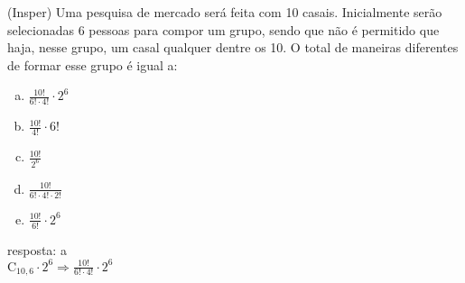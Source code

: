 \begin{ex}
   (Insper) Uma pesquisa de mercado será feita com 10 casais. Inicialmente serão selecionadas 6 pessoas para compor um grupo, sendo que não é permitido que haja, nesse grupo, um casal qualquer dentre os 10. O total de maneiras diferentes de formar esse grupo é igual a:
    \begin{enumerate} [(a)]
        \item $\frac{10!}{6!\cdot4!}\cdot2^6$
        \item $\frac{10!}{4!}\cdot 6!$
        \item $\frac{10!}{2^6}$
        \item $\frac{10!}{6!\cdot4!\cdot2!}$
        \item $\frac{10!}{6!}\cdot2^6$
    \end{enumerate}
      \begin{sol}
      resposta: a \\
      $\mathrm{C}_{{10},6}\cdot 2^6\Longrightarrow \frac{10!}{6!\cdot4!}\cdot2^6$
      \end{sol}
 \end{ex}